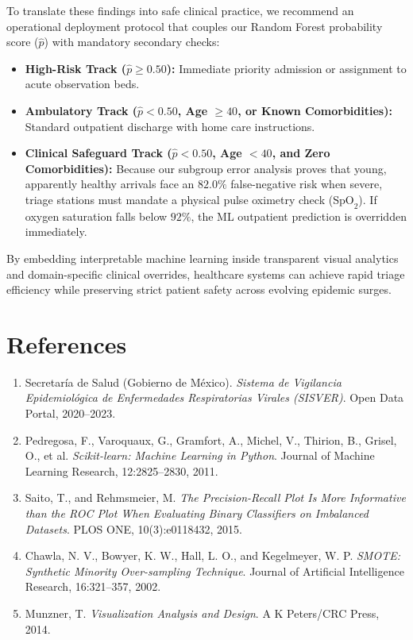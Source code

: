 \documentclass{article}
\begin{document}
To translate these findings into safe clinical practice, we recommend an operational deployment protocol that couples our Random Forest probability score ($\hat{p}$) with mandatory secondary checks:
\begin{itemize}
    \item \textbf{High-Risk Track ($\hat{p} \ge 0.50$):} Immediate priority admission or assignment to acute observation beds.
    \item \textbf{Ambulatory Track ($\hat{p} < 0.50$, Age $\ge 40$, or Known Comorbidities):} Standard outpatient discharge with home care instructions.
    \item \textbf{Clinical Safeguard Track ($\hat{p} < 0.50$, Age $< 40$, and Zero Comorbidities):} Because our subgroup error analysis proves that young, apparently healthy arrivals face an $82.0\%$ false-negative risk when severe, triage stations must mandate a physical pulse oximetry check ($\text{SpO}_2$). If oxygen saturation falls below $92\%$, the ML outpatient prediction is overridden immediately.
\end{itemize}

By embedding interpretable machine learning inside transparent visual analytics and domain-specific clinical overrides, healthcare systems can achieve rapid triage efficiency while preserving strict patient safety across evolving epidemic surges.

\section*{References}

\small
\begin{enumerate}
    \item Secretaría de Salud (Gobierno de México). \emph{Sistema de Vigilancia Epidemiológica de Enfermedades Respiratorias Virales (SISVER)}. Open Data Portal, 2020--2023.
    \item Pedregosa, F., Varoquaux, G., Gramfort, A., Michel, V., Thirion, B., Grisel, O., et al. \emph{Scikit-learn: Machine Learning in Python}. Journal of Machine Learning Research, 12:2825--2830, 2011.
    \item Saito, T., and Rehmsmeier, M. \emph{The Precision-Recall Plot Is More Informative than the ROC Plot When Evaluating Binary Classifiers on Imbalanced Datasets}. PLOS ONE, 10(3):e0118432, 2015.
    \item Chawla, N. V., Bowyer, K. W., Hall, L. O., and Kegelmeyer, W. P. \emph{SMOTE: Synthetic Minority Over-sampling Technique}. Journal of Artificial Intelligence Research, 16:321--357, 2002.
    \item Munzner, T. \emph{Visualization Analysis and Design}. A K Peters/CRC Press, 2014.
\end{enumerate}
\end{document}
